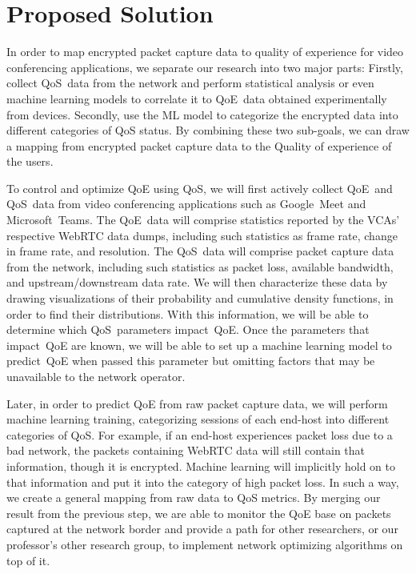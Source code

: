 \section{Proposed Solution}\label{proposed-solution}
    In order to map encrypted packet capture data to quality of experience for video conferencing applications, we separate our research into two major parts: Firstly, collect QoS~data from the network and perform statistical analysis or even machine learning models to correlate it to QoE~data obtained experimentally from devices. Secondly, use the ML model to categorize the encrypted data into different categories of QoS status. By combining these two sub-goals, we can draw a mapping from encrypted packet capture data to the Quality of experience of the users.

    To control and optimize QoE using QoS, we will first actively collect QoE~and QoS~data from video conferencing applications such as Google~Meet and Microsoft~Teams. The QoE~data will comprise statistics reported by the VCAs' respective WebRTC data dumps, including such statistics as frame rate, change in frame rate, and resolution. The QoS~data will comprise packet capture data from the network, including such statistics as packet loss, available bandwidth, and upstream/downstream data rate. We will then characterize these data by drawing visualizations of their probability and cumulative density functions, in order to find their distributions. With this information, we will be able to determine which QoS~parameters impact~QoE. Once the parameters that impact~QoE are known, we will be able to set up a machine learning model to predict~QoE when passed this parameter but omitting factors that may be unavailable to the network operator.

    Later, in order to predict QoE from raw packet capture data, we will perform machine learning training, categorizing sessions of each end-host into different categories of QoS. For example, if an end-host experiences packet loss due to a bad network, the packets containing WebRTC data will still contain that information, though it is encrypted. Machine learning will implicitly hold on to that information and put it into the category of high packet loss. In such a way, we create a general mapping from raw data to QoS metrics. By merging our result from the previous step, we are able to monitor the QoE base on packets captured at the network border and provide a path for other researchers, or our professor's other research group, to implement network optimizing algorithms on top of it. 